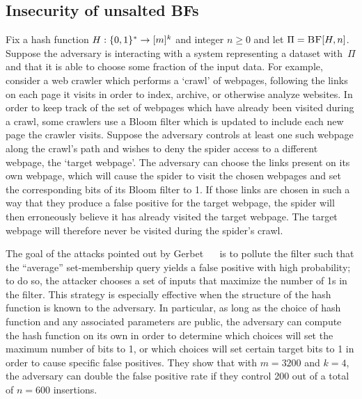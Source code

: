 \subsection{Insecurity of unsalted BFs}
Fix a hash function $H:\{0,1\}^*\to[m]^k$ and integer $n\geq0$ and
let $\Pi = \textnormal{\textsc{BF}}[H,n]$.
%
Suppose the adversary is interacting with a system representing a dataset
with~$\Pi$ and that it is able to choose some fraction of the input data.  For
example, consider a web crawler which performs a `crawl' of webpages, following
the links on each page it visits in order to index, archive, or otherwise
analyze websites. In order to keep track of the set of webpages which have
already been visited during a crawl, some crawlers use a Bloom filter which is
updated to include each new page the crawler visits. Suppose the adversary
controls at least one such webpage along the crawl's path and wishes to deny the
spider access to a different webpage, the `target webpage'. The adversary can
choose the links present on its own webpage, which will cause the spider to
visit the chosen webpages and set the corresponding bits of its Bloom filter to
1. If those links are chosen in such a way that they produce a false positive
for the target webpage, the spider will then erroneously believe it has already
visited the target webpage. The target webpage will therefore never be visited
during the spider's crawl.

%
%
The goal of the attacks pointed out by Gerbet \etal~~\cite{gerbet2015power} is
to pollute the filter such that the ``average'' set-membership query yields a
false positive with high probability; to do so, the attacker chooses a set of
inputs that maximize the number of 1s in the filter. This strategy is especially
effective when the structure of the hash function is known to the adversary. In
particular, as long as the choice of hash function and any associated parameters
are public, the adversary can compute the hash function on its own in order to
determine which choices will set the maximum number of bits to 1, or which
choices will set certain target bits to 1 in order to cause specific false
positives. They show that with $m = 3200$ and $k = 4$, the adversary can double
the false positive rate if they control 200 out of a total of $n = 600$
insertions.

